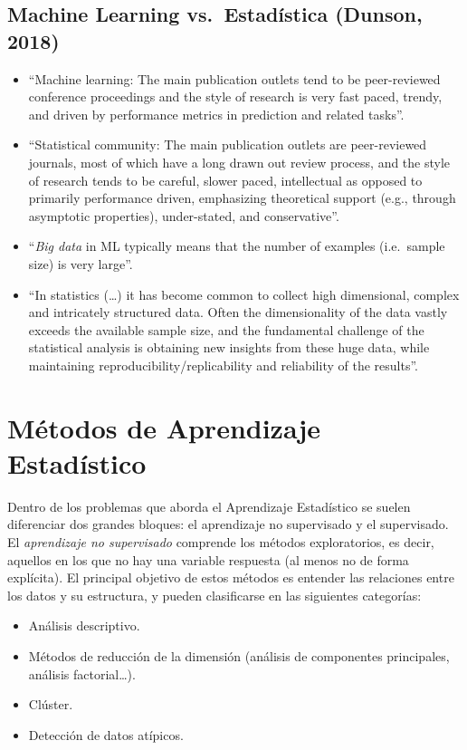 \documentclass[]{book}
\theoremstyle{break}
\theoremstyle{definition}
\theoremstyle{definition}
\theoremstyle{definition}
\theoremstyle{remark}
\begin{document}
\subsection{Machine Learning vs.~Estadística (Dunson,
2018)}\label{machine-learning-vs.estaduxedstica-dunson-2018}

\begin{itemize}
\item
  ``Machine learning: The main publication outlets tend to be
  peer-reviewed conference proceedings and the style of research is very
  fast paced, trendy, and driven by performance metrics in prediction
  and related tasks''.
\item
  ``Statistical community: The main publication outlets are
  peer-reviewed journals, most of which have a long drawn out review
  process, and the style of research tends to be careful, slower paced,
  intellectual as opposed to primarily performance driven, emphasizing
  theoretical support (e.g., through asymptotic properties),
  under-stated, and conservative''.
\item
  ``\emph{Big data} in ML typically means that the number of examples
  (i.e.~sample size) is very large''.
\item
  ``In statistics (\ldots{}) it has become common to collect high
  dimensional, complex and intricately structured data. Often the
  dimensionality of the data vastly exceeds the available sample size,
  and the fundamental challenge of the statistical analysis is obtaining
  new insights from these huge data, while maintaining
  reproducibility/replicability and reliability of the results''.
\end{itemize}

\section{Métodos de Aprendizaje
Estadístico}\label{muxe9todos-de-aprendizaje-estaduxedstico}

Dentro de los problemas que aborda el Aprendizaje Estadístico se suelen
diferenciar dos grandes bloques: el aprendizaje no supervisado y el
supervisado. El \emph{aprendizaje no supervisado} comprende los métodos
exploratorios, es decir, aquellos en los que no hay una variable
respuesta (al menos no de forma explícita). El principal objetivo de
estos métodos es entender las relaciones entre los datos y su
estructura, y pueden clasificarse en las siguientes categorías:

\begin{itemize}
\item
  Análisis descriptivo.
\item
  Métodos de reducción de la dimensión (análisis de componentes
  principales, análisis factorial\ldots{}).
\item
  Clúster.
\item
  Detección de datos atípicos.
\end{itemize}
\end{document}
